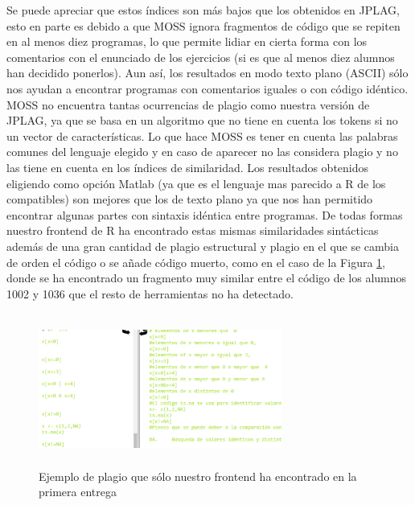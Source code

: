 Se puede apreciar que estos índices son más bajos que los obtenidos en JPLAG, esto en parte es debido a que MOSS ignora fragmentos de código que se repiten en al menos diez programas, lo que permite lidiar en cierta forma con los comentarios con el enunciado de los ejercicios (si es que al menos diez alumnos han decidido ponerlos).
\newline
Aun así, los resultados en modo texto plano (ASCII) sólo nos ayudan a encontrar programas con comentarios iguales o con código idéntico.
\newline
MOSS no encuentra tantas ocurrencias de plagio como nuestra versión de JPLAG, ya que se basa en un algoritmo que no tiene en cuenta los tokens si no un vector de características.
\newline
Lo que hace MOSS es tener en cuenta las palabras comunes del lenguaje elegido y en caso de aparecer no las considera plagio y no las tiene en cuenta en los índices de similaridad.
\newline
Los resultados obtenidos eligiendo como opción Matlab (ya que es el lenguaje mas parecido a R de los compatibles) son mejores que los de texto plano ya que nos han permitido encontrar algunas partes con sintaxis idéntica entre programas. De todas formas nuestro frontend de R ha encontrado estas mismas similaridades sintácticas además de una gran cantidad de plagio estructural y plagio en el que se cambia de orden el código o se añade código muerto, como en el caso de la Figura  \ref{fig:ENTREGA1_ESTRUCTURAL}, donde se ha encontrado un fragmento muy similar entre el código de los alumnos 1002 y 1036 que el resto de herramientas no ha detectado.

\bigskip
\begin{figure}[H] %
\centering
\includegraphics[width=8cm, height=5cm]{imagenes/ENTREGA1_ESTRUCTURAL.png}  %
\caption{Ejemplo de plagio que sólo nuestro frontend ha encontrado en la primera entrega} \label{fig:ENTREGA1_ESTRUCTURAL}
\end{figure}

